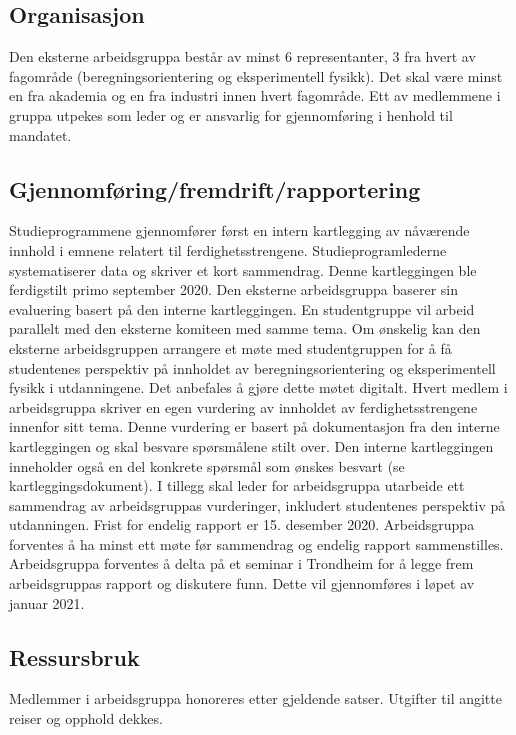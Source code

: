 \documentclass{article}
\begin{document}
\subsection{Organisasjon}
Den eksterne arbeidsgruppa består av minst 6 representanter, 3 fra hvert av fagområde (beregningsorientering og eksperimentell fysikk). Det skal være minst en fra akademia og en fra industri innen hvert fagområde.
Ett av medlemmene i gruppa utpekes som leder og er ansvarlig for gjennomføring i henhold til mandatet.

\subsection{Gjennomføring/fremdrift/rapportering}
Studieprogrammene gjennomfører først en intern kartlegging av nåværende innhold i emnene relatert til ferdighetsstrengene. Studieprogramlederne systematiserer data og skriver et kort sammendrag. Denne kartleggingen ble ferdigstilt primo september 2020.
Den eksterne arbeidsgruppa baserer sin evaluering basert på den interne kartleggingen. En studentgruppe vil arbeid parallelt med den eksterne komiteen med samme tema. Om ønskelig kan den eksterne arbeidsgruppen arrangere et møte med studentgruppen for å få studentenes perspektiv på innholdet av beregningsorientering og eksperimentell fysikk i utdanningene. Det anbefales å gjøre dette møtet digitalt.
Hvert medlem i arbeidsgruppa skriver en egen vurdering av innholdet av ferdighetsstrengene innenfor sitt tema. Denne vurdering er basert på dokumentasjon fra den interne kartleggingen og skal besvare spørsmålene stilt over. Den interne kartleggingen inneholder også en del konkrete spørsmål som ønskes besvart (se kartleggingsdokument).
I tillegg skal leder for arbeidsgruppa utarbeide ett sammendrag av arbeidsgruppas vurderinger, inkludert studentenes perspektiv på utdanningen.
Frist for endelig rapport er 15. desember 2020.
Arbeidsgruppa forventes å ha minst ett møte før sammendrag og endelig rapport sammenstilles.
Arbeidsgruppa forventes å delta på et seminar i Trondheim for å legge frem arbeidsgruppas rapport og diskutere funn. Dette vil gjennomføres i løpet av januar 2021.

\subsection{Ressursbruk}
Medlemmer i arbeidsgruppa honoreres etter gjeldende satser.
Utgifter til angitte reiser og opphold dekkes.



\end{document}
